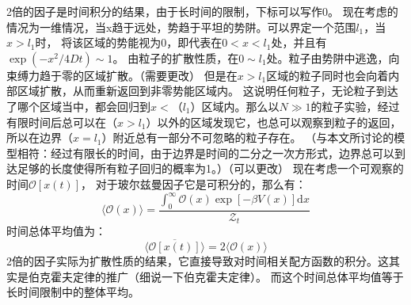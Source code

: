 2倍的因子是时间积分的结果，由于长时间的限制，下标可以写作0。
现在考虑的情况为一维情况，当x趋于远处，势趋于平坦的势阱。可以界定一个范围$l_{1}$，当$x>l_{1}$时，
将该区域的势能视为0，即代表在$0<x<l_{1}$处，并且有$\exp \left(-x^{2} / 4 D t\right) \sim 1$。
由粒子的扩散性质，在$0\sim l_{1}$处。粒子由势阱中逃逸，向束缚力趋于零的区域扩散。（需要更改）
但是在$x>l_{1}$区域的粒子同时也会向着内部区域扩散，从而重新返回到非零势能区域内。
这说明任何粒子，无论粒子到达了哪个区域当中，都会回归到$x<（l_{1}）$区域内。那么以$N\gg1$的粒子实验，经过有限时间后总可以在$（x>l_{1}）$以外的区域发现它，也总可以观察到粒子的返回，所以在边界$（x=l_{1}）$附近总有一部分不可忽略的粒子存在。
（与本文所讨论的模型相符：经过有限长的时间，由于边界是时间的二分之一次方形式，边界总可以到达足够的长度使得所有粒子回归的概率为1。）（可以更改）
现在考虑一个可观察的时间$\mathcal{O}[x(t)]$，
对于玻尔兹曼因子它是可积分的，那么有：\begin{equation}
\langle\mathcal{O}(x)\rangle=\frac{\int_{0}^{\infty} \mathcal{O}(x) \exp [-\beta V(x)] \mathrm{d} x}{\mathcal{Z}_{t}}
\end{equation}
时间总体平均值为：
\begin{equation}
\langle\overline{\mathcal{O}[x(t)]}\rangle=2\langle\mathcal{O}(x)\rangle
\end{equation}
2倍的因子实际为扩散性质的结果，它直接导致对时间相关配方函数的积分。这其实是伯克霍夫定律的推广（细说一下伯克霍夫定律）。
而这个时间总体平均值等于长时间限制中的整体平均。

